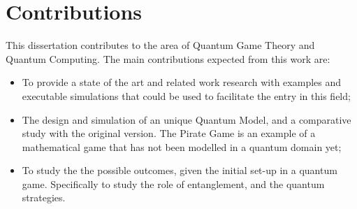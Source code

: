\section{Contributions}
\label{sec:int_contributions}

This dissertation contributes to the area of Quantum Game Theory and Quantum Computing. The main contributions expected from this work are:

\begin{itemize}

\item To provide a state of the art and related work research with examples and executable simulations that could be used to facilitate the entry in this field;

\item The design and simulation of an unique Quantum Model, and a comparative study with the original version. The Pirate Game is an example of a mathematical game that has not been modelled in a quantum domain yet;

\item To study the the possible outcomes, given the initial set-up in a quantum game. Specifically to study the role of entanglement, and the quantum strategies.

\end{itemize}